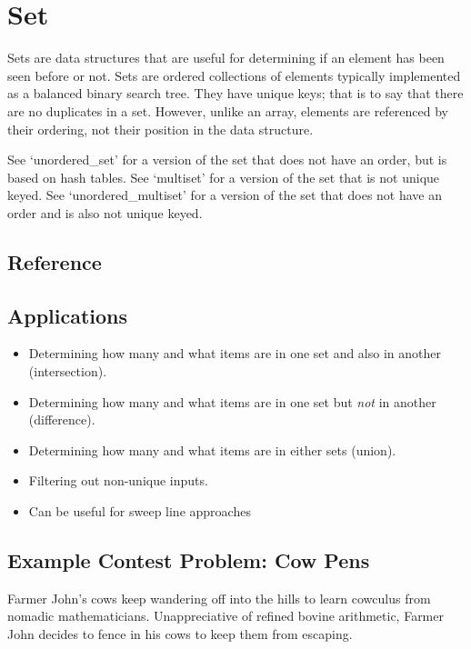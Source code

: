 \section{Set}
Sets are data structures that are useful for determining if an element has been seen before or not.
Sets are ordered collections of elements typically implemented as a balanced binary search tree.
They have unique keys; that is to say that there are no duplicates in a set.
However, unlike an array, elements are referenced by their ordering, not their position in the data structure.

See `unordered\_set' for a version of the set that does not have an order, but is based on hash tables.
See `multiset' for a version of the set that is not unique keyed.
See `unordered\_multiset' for a version of the set that does not have an order and is also not unique keyed.

\subsection{Reference}

\subsection{Applications}

\begin{itemize}
	\item Determining how many and what items are in one set and also in another (intersection).
	\item Determining how many and what items are in one set but \emph{not} in another (difference).
	\item Determining how many and what items are in either sets (union).
	\item Filtering out non-unique inputs.
    \item Can be useful for sweep line approaches
\end{itemize}

\subsection{Example Contest Problem: Cow Pens}
Farmer John's cows keep wandering off into the hills to learn cowculus from nomadic mathematicians.
Unappreciative of refined bovine arithmetic, Farmer John decides to fence in his cows to keep them from escaping.

